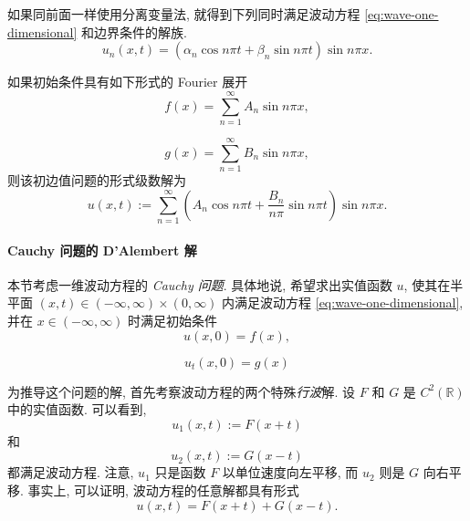如果同前面一样使用分离变量法, 就得到下列同时满足波动方程 \eqref{eq:wave-one-dimensional} 和边界条件的解族.
\begin{equation}\label{eq:wave-separated-modes}
u_n(x,t)=(\alpha_n\cos n\pi t+\beta_n\sin n\pi t)\sin n\pi x.
\end{equation}


如果初始条件具有如下形式的 Fourier 展开
\begin{equation}\label{eq:wave-position-fourier-series}
f(x)=\sum_{n=1}^{\infty}A_n\sin n\pi x,
\end{equation}

\begin{equation}\label{eq:wave-velocity-fourier-series}
g(x)=\sum_{n=1}^{\infty}B_n\sin n\pi x,
\end{equation}
则该初边值问题的形式级数解为
\begin{equation}\label{eq:wave-interval-series-solution}
u(x,t):=\sum_{n=1}^{\infty}\left(A_n\cos n\pi t+\dfrac{B_n}{n\pi}\sin n\pi t\right)\sin n\pi x.
\end{equation}


\paragraph*{Cauchy 问题的 D'Alembert 解}

本节考虑一维波动方程的 \emph{Cauchy 问题}. 具体地说, 希望求出实值函数 $u$, 使其在半平面 $(x,t)\in(-\infty,\infty)\times(0,\infty)$ 内满足波动方程 \eqref{eq:wave-one-dimensional}, 并在 $x\in(-\infty,\infty)$ 时满足初始条件
\begin{equation}\label{eq:wave-cauchy-initial-position}
u(x,0)=f(x),
\end{equation}

\begin{equation}\label{eq:wave-cauchy-initial-velocity}
u_t(x,0)=g(x)
\end{equation}


为推导这个问题的解, 首先考察波动方程的两个特殊\emph{行波}解. 设 $F$ 和 $G$ 是 $C^2(\mathbb{R})$ 中的实值函数. 可以看到,
\begin{equation}\label{eq:left-traveling-wave}
u_1(x,t):=F(x+t)
\end{equation}
和
\begin{equation}\label{eq:right-traveling-wave}
u_2(x,t):=G(x-t)
\end{equation}
都满足波动方程. 注意, $u_1$ 只是函数 $F$ 以单位速度向左平移, 而 $u_2$ 则是 $G$ 向右平移. 事实上, 可以证明, 波动方程的任意解都具有形式
\begin{equation}\label{eq:wave-traveling-sum}
u(x,t)=F(x+t)+G(x-t).
\end{equation}


